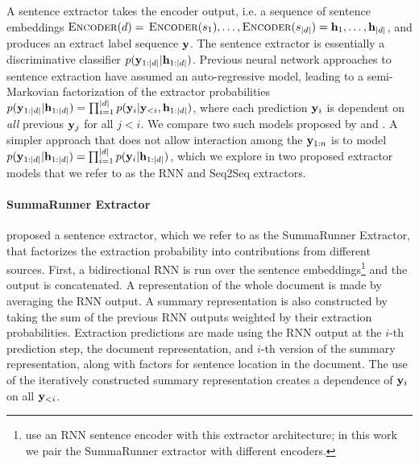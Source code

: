 A sentence extractor takes the encoder output, i.e. 
a sequence of sentence embeddings
$\textsc{Encoder}(d) =$ $\textsc{Encoder}(s_1), \ldots, \textsc{Encoder}(s_{|d|}) =
\mathbf{h}_1, \ldots, \mathbf{h}_{|d|}$, and produces an extract label sequence
$\mathbf{y}$. 
The sentence extractor is essentially a discriminative
classifier $p(\mathbf{y}_{1:| d |} | \mathbf{h}_{1:| d |})$.
Previous neural network approaches to sentence extraction have assumed
an auto-regressive model, leading to a semi-Markovian
factorization of the extractor probabilities
$p(\mathbf{y}_{1:| d |} | \mathbf{h}_{1:| d |})=\prod_{i=1}^{|d|} 
p(\mathbf{y}_i|\mathbf{y}_{<i},\mathbf{h}_{1:| d |})$,
where each prediction $\mathbf{y}_i$ is dependent on \emph{all}
previous $\mathbf{y}_j$ for
all $j < i$. We compare two such models proposed by \cite{cheng2016neural}
and \cite{nallapati2016summarunner}.
A simpler approach that does not allow interaction among the $\mathbf{y}_{1:n}$
is to
model $p(\mathbf{y}_{1:| d |}|\mathbf{h}_{1:| d |}) = 
\prod_{i=1}^{| d |} p(\mathbf{y}_i|\mathbf{h}_{1:| d |})$,
  which we explore in two proposed extractor models that we refer to as the RNN 
  and Seq2Seq extractors.

\paragraph{SummaRunner Extractor}\citet{nallapati2016summarunner} proposed
a sentence extractor, which we refer to as the SummaRunner Extractor,
that factorizes the extraction probability into contributions 
from different sources.
First, a bidirectional RNN is run over the sentence embeddings\footnote{\citet{nallapati2016summarunner}
    use an RNN sentence encoder with 
this extractor architecture; in this work we pair the SummaRunner extractor
with different encoders. } and the output is
concatenated. A representation of the whole document is made by 
averaging the RNN output. A summary representation is also constructed 
by taking the sum of the previous RNN outputs weighted by their extraction
probabilities. Extraction predictions are made using 
the RNN output at the $i$-th prediction step, the document representation, and 
$i$-th version of the summary representation, along with factors for 
sentence location in the document. The use of the iteratively constructed
summary representation creates a dependence of $\mathbf{y}_i$ on all 
$\mathbf{y}_{<i}$.




